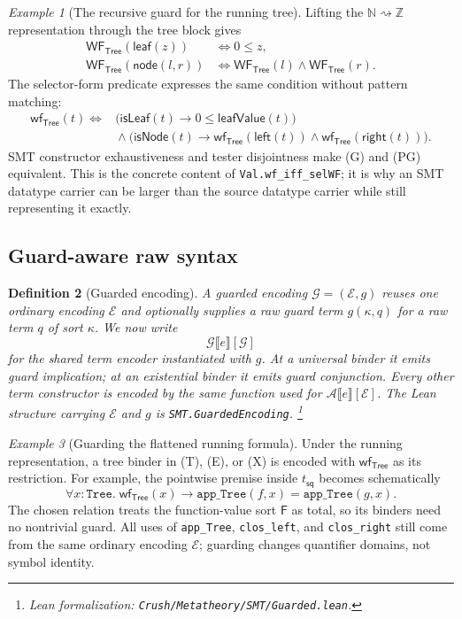 \documentclass[11pt]{article}
\newtheorem{definition}{Definition}[section]
\theoremstyle{remark}
\newtheorem{example}[definition]{Example}
\newcommand{\leanfile}[1]{\footnote{Lean formalization: \texttt{Crush/Metatheory/#1}.}}
\newcommand{\smtenc}[2]{\mathcal A\llbracket #2\rrbracket[#1]}
\newcommand{\guardenc}[2]{\mathcal G\llbracket #2\rrbracket[#1]}
\newcommand{\WF}{\mathsf{WF}}
\newcommand{\Tree}{\mathsf{Tree}}
\newcommand{\TreeFun}{\mathsf{F}}
\begin{document}
\begin{example}[The recursive guard for the running tree]
Lifting the $\mathbb N\rightsquigarrow\mathbb Z$ representation through the
tree block gives
\[
\begin{aligned}
 \WF_{\Tree}(\mathsf{leaf}(z))
   &\Longleftrightarrow 0\le z,\\
 \WF_{\Tree}(\mathsf{node}(l,r))
   &\Longleftrightarrow
     \WF_{\Tree}(l)\land\WF_{\Tree}(r).
\end{aligned}
\tag{G}
\]
The selector-form predicate expresses the same condition without pattern
matching:
\[
\begin{aligned}
 \mathsf{wf}_{\Tree}(t)\Longleftrightarrow{}&
 \bigl(\mathsf{isLeaf}(t)\to 0\le\mathsf{leafValue}(t)\bigr)\\
 &{}\land
 \bigl(\mathsf{isNode}(t)\to
   \mathsf{wf}_{\Tree}(\mathsf{left}(t))\land
   \mathsf{wf}_{\Tree}(\mathsf{right}(t))\bigr).
\end{aligned}
\tag{PG}
\]
SMT constructor exhaustiveness and tester disjointness make (G) and (PG)
equivalent. This is the concrete content of
\texttt{Val.wf\_iff\_selWF}; it is why an SMT datatype carrier can be
larger than the source datatype carrier while still representing it exactly.
\end{example}

\subsection{Guard-aware raw syntax}

\begin{definition}[Guarded encoding]
A guarded encoding $\mathcal G=(\mathcal E,g)$ reuses one ordinary encoding
$\mathcal E$ and optionally supplies a raw guard term $g(\kappa,q)$ for a raw
term $q$ of sort $\kappa$. We now write
\[
 \guardenc{\mathcal G}{e}
\]
for the shared term encoder instantiated with $g$. At a universal binder it
emits guard implication; at an existential binder it emits guard conjunction.
Every other term constructor is encoded by the same function used for
$\smtenc{\mathcal E}{e}$.
The Lean structure carrying $\mathcal E$ and $g$ is
\texttt{SMT.GuardedEncoding}.
\leanfile{SMT/Guarded.lean}
\end{definition}

\begin{example}[Guarding the flattened running formula]
Under the running representation, a tree binder in (T), (E), or (X) is encoded
with $\mathsf{wf}_{\Tree}$ as its restriction. For example, the pointwise
premise inside $t_{\mathsf{sq}}$ becomes schematically
\[
 \forall x{:}\texttt{Tree}.\;
   \mathsf{wf}_{\Tree}(x)\to
   \texttt{app\_Tree}(f,x)=\texttt{app\_Tree}(g,x).
\]
The chosen relation treats the function-value sort $\TreeFun$ as total, so its
binders need no nontrivial guard. All uses of \texttt{app\_Tree},
\texttt{clos\_left}, and \texttt{clos\_right} still come from the same ordinary
encoding $\mathcal E$; guarding changes quantifier domains, not symbol identity.
\end{example}
\end{document}
